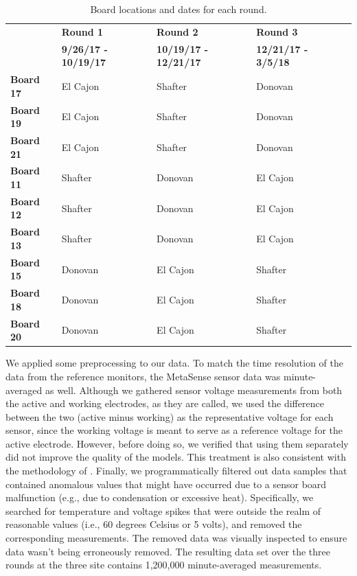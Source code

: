 \documentclass[journal abbreviation, manuscript]{copernicus}
\begin{document}
\begin{table}[t]
\centering
\caption{Board locations and dates for each round.}
\begin{tabular}{l|llll}
                  & \textbf{Round 1} &            \textbf{Round 2} &                   \textbf{Round 3} \\
         & \textbf{9/26/17 - 10/19/17} & \textbf{10/19/17 - 12/21/17} & \textbf{12/21/17 - 3/5/18} \\ \hline
\textbf{Board 17} & El Cajon    & Shafter      & Donovan    \\
\textbf{Board 19} &  El Cajon    & Shafter     & Donovan   \\
\textbf{Board 21} &  El Cajon    & Shafter     & Donovan  \\ \hline
\textbf{Board 11} &  Shafter      & Donovan  & El Cajon  \\
\textbf{Board 12} &  Shafter      & Donovan  & El Cajon  \\
\textbf{Board 13} &  Shafter      & Donovan  & El Cajon  \\ \hline
\textbf{Board 15} &  Donovan   & El Cajon   & Shafter    \\
\textbf{Board 18} &  Donovan   & El Cajon   & Shafter     \\
\textbf{Board 20} &  Donovan   & El Cajon   & Shafter   
\end{tabular}
\label{tab:board-rotations}
\end{table}

We applied some preprocessing to our data.  To match the time resolution of the data from the reference monitors, the MetaSense sensor data was minute-averaged as well.  Although we gathered sensor voltage measurements from both the active and working electrodes, as they are called, we used the difference between the two (active minus working) as the representative voltage for each sensor, since the working voltage is meant to serve as a reference voltage for the active electrode.  However, before doing so, we verified that using them separately did not improve the quality of the models.  This treatment is also consistent with the methodology of \citet{Zimmerman2018}.  Finally, we programmatically filtered out data samples that contained anomalous values that might have occurred due to a sensor board malfunction (e.g., due to condensation or excessive heat).  Specifically, we searched for temperature and voltage spikes that were outside the realm of reasonable values (i.e., 60 degrees Celsius or 5 volts), and removed the corresponding measurements.  The removed data was visually inspected to ensure data wasn't being erroneously removed.  The resulting data set over the three rounds at the three site contains 1,200,000 minute-averaged measurements.
\end{document}
